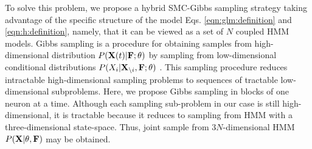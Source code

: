%
%

To solve this problem, we propose a hybrid SMC-Gibbs sampling strategy taking advantage of the specific structure of the model Eqs. \eqref{eqn:glm:definition} and \eqref{eqn:h:definition}, namely, that it can be viewed as a set of $N$ coupled HMM models. Gibbs sampling is a procedure for obtaining samples from high-dimensional distribution $P({\bf X}(t) | {\bf F}; \mathbf{\theta})$ by sampling from low-dimensional conditional distributions $P(X_{i}|{\bf X}_{\backslash i}, {\bf F}; \mathbf{\theta})$  \cite{Gelfand1990}.  This sampling procedure reduces intractable high-dimensional sampling problems to sequences of tractable low-dimensional subproblems.  Here, we propose Gibbs sampling in blocks of one neuron at a time.  
%
%
Although each sampling sub-problem in our case is still high-dimensional, it is tractable because it reduces to sampling from HMM with a three-dimensional state-space. Thus, joint sample from $3N$-dimensional HMM $P({\bf X}|\mathbf{\theta}, {\bf F})$ may be obtained.

